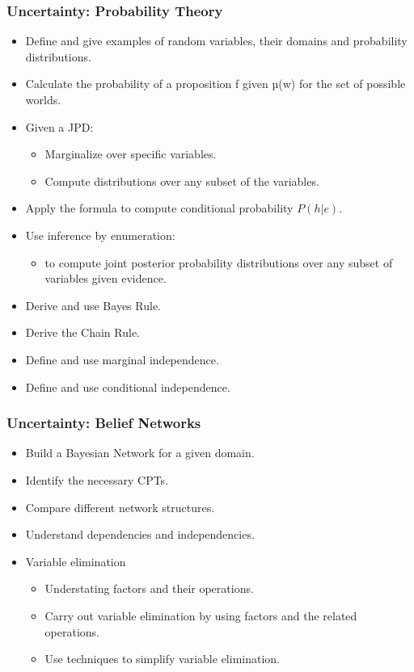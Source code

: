 \documentclass{article}
\begin{document}
\subsubsection*{Uncertainty: Probability Theory}

\begin{itemize}
    \item Define and give examples of random variables, their domains and probability distributions.
    \item Calculate the probability of a proposition f given µ(w) for the set of possible worlds.
    \item Given a JPD:
        \begin{itemize}
            \item Marginalize over specific variables.
            \item Compute distributions over any subset of the variables.
        \end{itemize}
    \item Apply the formula to compute conditional probability $P(h|e)$.
    \item Use inference by enumeration:
        \begin{itemize}
            \item to compute joint posterior probability distributions over any subset of variables given evidence.
        \end{itemize}
    \item Derive and use Bayes Rule.
    \item Derive the Chain Rule.
    \item Define and use marginal independence.
    \item Define and use conditional independence.
\end{itemize}

\subsubsection*{Uncertainty: Belief Networks}

\begin{itemize}
    \item Build a Bayesian Network for a given domain.
    \item Identify the necessary CPTs.
    \item Compare different network structures.
    \item Understand dependencies and independencies.
    \item Variable elimination
        \begin{itemize}
            \item Understating factors and their operations.
            \item Carry out variable elimination by using factors and the related operations.
            \item Use techniques to simplify variable elimination.
        \end{itemize}
\end{itemize}
\end{document}
